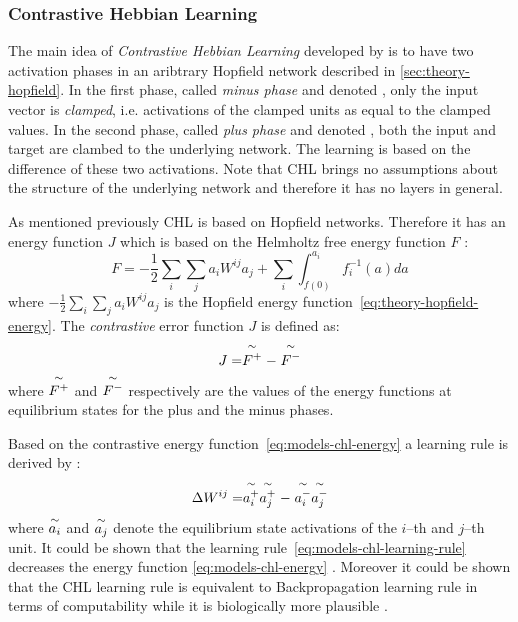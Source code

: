 \def\myover#1#2{\mathrel{\overset{\makebox[0pt]{#2}}{#1}}}
\newcommand{\mytilde}{\raise.17ex\hbox{$\scriptstyle\mathtt{\sim}$}}
\def\myequi#1{\myover{#1}{\mytilde}}

\subsubsection{Contrastive Hebbian Learning}
\label{models-chl} 

The main idea of \emph{Contrastive Hebbian Learning} developed by \citet{movellan1990contrastive} is to have two activation phases in an aribtrary Hopfield network \citep{hopfield1984neurons} described in \ref{sec:theory-hopfield}. In the first phase, called \emph{minus phase} and denoted \quotes{-}, only the input vector is \emph{clamped}, i.e. activations of the clamped units as equal to the clamped values. In the second phase, called \emph{plus phase} and denoted \quotes{+}, both the input and target are clambed to the underlying network. The learning is based on the difference of these two activations. Note that CHL brings no assumptions about the structure of the underlying network and therefore it has no layers in general. 

As mentioned previously CHL is based on Hopfield networks. Therefore it has an energy function $J$ which is based on the Helmholtz free energy function $F$ \citep{hinton1989deterministic}:
\begin{equation}
  \label{eq:models-chl-helmholtz}
  F = -\frac{1}{2}\sum_i\sum_ja_iW^{ij}a_j + \sum_i \int_{f(0)}^{a_i} f_i^{-1}(a)da
\end{equation} 
where $-\frac{1}{2}\sum_i\sum_ja_iW^{ij}a_j$ is the Hopfield energy function~\ref{eq:theory-hopfield-energy}. The \emph{contrastive} error function $J$ is defined as: 
\begin{equation}
  \label{eq:models-chl-energy}
  J = \myequi{F^{+}} - \myequi{F^{-}}
\end{equation} 
where $\myequi{F^{+}}$ and $\myequi{F^{-}}$ respectively are the values of the energy functions at equilibrium states for the plus and the minus phases. 

Based on the contrastive energy function~\ref{eq:models-chl-energy} a learning rule is derived by \citet{movellan1990contrastive}: 
\begin{equation}
  \label{eq:models-chl-learning-rule}
  \Delta W^{ij} = \myequi{a_i^{+}}\myequi{a_j^{+}} - \myequi{a_i^{-}}\myequi{a_j^{-}}
\end{equation}
where $\myequi{a_i}$ and $\myequi{a_j}$ denote the equilibrium state activations of the $i$--th and $j$--th unit. It could be shown that the learning rule~\ref{eq:models-chl-learning-rule} decreases the energy function \ref{eq:models-chl-energy} \citep{movellan1990contrastive}. Moreover it could be shown that the CHL learning rule is equivalent to Backpropagation learning rule in terms of computability while it is biologically more plausible \citep{o1996bio, xie2003equivalence}. 

   
